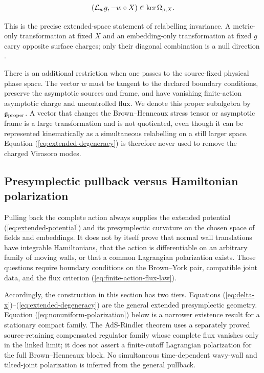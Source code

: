 \begin{align}
(\mathcal L_wg,-w\circ X)
\in\ker\Omega_{{\rm p},X}. \label{eq:extended-degeneracy}
\end{align}

This is the precise extended-space statement of relabelling invariance. A metric-only transformation at fixed $X$ and an embedding-only transformation at fixed $g$ carry opposite surface charges; only their diagonal combination is a null direction \cite{Donnelly:2016auv,Speranza:2017guc}.

There is an additional restriction when one passes to the source-fixed physical phase space. The vector $w$ must be tangent to the declared boundary conditions, preserve the asymptotic sources and frame, and have vanishing finite-action asymptotic charge and uncontrolled flux. We denote this proper subalgebra by $\mathfrak g_{\rm proper}$. A vector that changes the Brown--Henneaux stress tensor or asymptotic frame is a large transformation and is not quotiented, even though it can be represented kinematically as a simultaneous relabelling on a still larger space. Equation (\ref{eq:extended-degeneracy}) is therefore never used to remove the charged Virasoro modes.

\subsection{Presymplectic pullback versus Hamiltonian polarization}\label{subsec:presymplectic-versus-polarization}

Pulling back the complete action always supplies the extended potential (\ref{eq:extended-potential}) and its presymplectic curvature on the chosen space of fields and embeddings. It does not by itself prove that normal wall translations have integrable Hamiltonians, that the action is differentiable on an arbitrary family of moving walls, or that a common Lagrangian polarization exists. Those questions require boundary conditions on the Brown--York pair, compatible joint data, and the flux criterion (\ref{eq:finite-action-flux-law}).

Accordingly, the construction in this section has two tiers. Equations (\ref{eq:delta-x})--(\ref{eq:extended-degeneracy}) are the general extended presymplectic geometry. Equation (\ref{eq:nonuniform-polarization}) below is a narrower existence result for a stationary compact family. The AdS-Rindler theorem uses a separately proved source-retaining compensated regulator family whose complete flux vanishes only in the linked limit; it does not assert a finite-cutoff Lagrangian polarization for the full Brown--Henneaux block. No simultaneous time-dependent wavy-wall and tilted-joint polarization is inferred from the general pullback.

